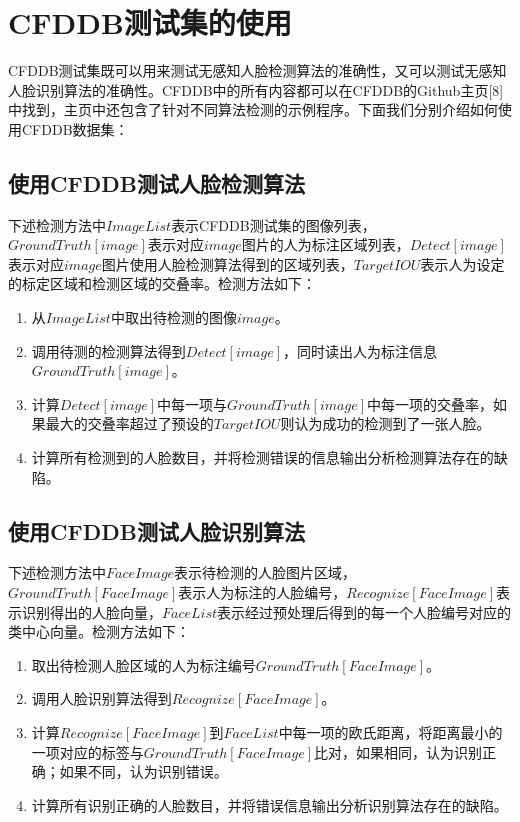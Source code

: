 \section{CFDDB测试集的使用}

CFDDB测试集既可以用来测试无感知人脸检测算法的准确性，又可以测试无感知人脸识别算法的准确性。CFDDB中的所有内容都可以在CFDDB的Github主页[8]中找到，主页中还包含了针对不同算法检测的示例程序。下面我们分别介绍如何使用CFDDB数据集：

\subsection{使用CFDDB测试人脸检测算法}

下述检测方法中$ImageList$表示CFDDB测试集的图像列表，$GroundTruth[image]$表示对应$image$图片的人为标注区域列表，$Detect[image]$表示对应$image$图片使用人脸检测算法得到的区域列表，$TargetIOU$表示人为设定的标定区域和检测区域的交叠率。检测方法如下：

\begin{enumerate}
	\item 从$ImageList$中取出待检测的图像$image$。
	\item 调用待测的检测算法得到$Detect[image]$，同时读出人为标注信息$GroundTruth[image]$。
	\item 计算$Detect[image]$中每一项与$GroundTruth[image]$中每一项的交叠率，如果最大的交叠率超过了预设的$TargetIOU$则认为成功的检测到了一张人脸。
	\item 计算所有检测到的人脸数目，并将检测错误的信息输出分析检测算法存在的缺陷。
\end{enumerate}

\subsection{使用CFDDB测试人脸识别算法}

下述检测方法中$FaceImage$表示待检测的人脸图片区域，$GroundTruth[FaceImage]$表示人为标注的人脸编号，$Recognize[FaceImage]$表示识别得出的人脸向量，$FaceList$表示经过预处理后得到的每一个人脸编号对应的类中心向量。检测方法如下：

\begin{enumerate}
	\item 取出待检测人脸区域的人为标注编号$GroundTruth[FaceImage]$。
	\item 调用人脸识别算法得到$Recognize[FaceImage]$。
	\item 计算$Recognize[FaceImage]$到$FaceList$中每一项的欧氏距离，将距离最小的一项对应的标签与$GroundTruth[FaceImage]$比对，如果相同，认为识别正确；如果不同，认为识别错误。
	\item 计算所有识别正确的人脸数目，并将错误信息输出分析识别算法存在的缺陷。
\end{enumerate}

